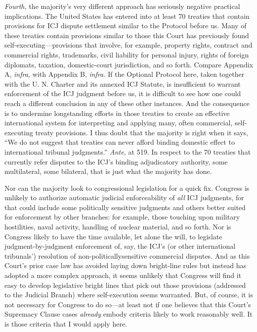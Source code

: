   \emph{Fourth,} the majority's very different approach has seriously
negative practical implications. The United States has entered
into at least 70 treaties that contain provisions for ICJ dispute
settlement similar to the Protocol before us. Many of these treaties
contain provisions similar to those this Court has previously found
self-executing---provisions that involve, for example, property rights,
contract and commercial rights, trademarks, civil liability for
personal injury, rights of foreign diplomats, taxation, domestic-court
jurisdiction, and so forth. Compare Appendix A, \emph{infra,} with
Appendix B, \emph{infra.} If the Optional Protocol here, taken
to\newpage gether with the U. N. Charter and its annexed ICJ Statute, is
insufficient to warrant enforcement of the ICJ judgment before us, it is
difficult to see how one could reach a different conclusion in any of
these other instances. And the consequence is to undermine longstanding
efforts in those treaties to create an effective international system
for interpreting and applying many, often commercial, self-executing
treaty provisions. I thus doubt that the majority is right when it says,
``We do not suggest that treaties can never afford binding domestic
effect to international tribunal judgments.'' \emph{Ante,} at 519. In
respect to the 70 treaties that currently refer disputes to the ICJ's
binding adjudicatory authority, some multilateral, some bilateral, that
is just what the majority has done.

  Nor can the majority look to congressional legislation for a quick
fix. Congress is unlikely to authorize automatic judicial enforceability
of \emph{all} ICJ judgments, for that could include some politically
sensitive judgments and others better suited for enforcement by other
branches: for example, those touching upon military hostilities,
naval activity, handling of nuclear material, and so forth. Nor is
Congress likely to have the time available, let alone the will, to
legislate judgment-by-judgment enforcement of, say, the ICJ's (or
other international tribunals') resolution of non-politicallysensitive
commercial disputes. And as this Court's prior case law has avoided
laying down bright-line rules but instead has adopted a more complex
approach, it seems unlikely that Congress will find it easy to develop
legislative bright lines that pick out those provisions (addressed to
the Judicial Branch) where self-execution seems warranted. But, of
course, it is not necessary for Congress to do so---at least not if one
believes that this Court's Supremacy Clause cases \emph{already} embody
criteria likely to work reasonably well. It is those criteria that I
would apply here.

